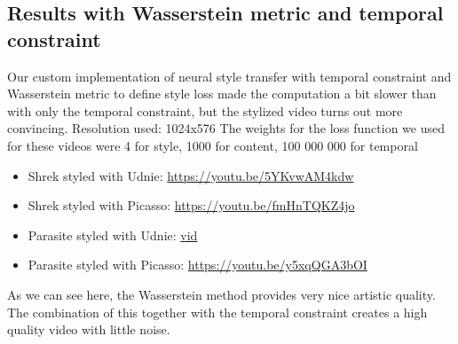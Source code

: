 \subsection{Results with Wasserstein metric and temporal constraint}
\label{sec:Results with wasserstein metric}
Our custom implementation of neural style transfer with temporal constraint and Wasserstein metric to define style loss made the computation a bit slower than with only the temporal constraint, but the stylized video turns out more convincing. \newline
Resolution used: 1024x576
The weights for the loss function we used for these videos were 4 for style, 1000 for content, 100 000 000 for temporal

\begin{itemize}
\item{Shrek styled with Udnie: \url{https://youtu.be/5YKvwAM4kdw}}
\item{Shrek styled with Picasso: \url{https://youtu.be/fmHnTQKZ4jo}}
\item{Parasite styled with Udnie: \url{vid}}
\item{Parasite styled with Picasso: \url{https://youtu.be/y5xqQGA3bOI}}
\end{itemize} 
As we can see here, the Wasserstein method provides very nice artistic quality. The combination of this together with the temporal constraint creates a high quality video with little noise. 
\newpage
